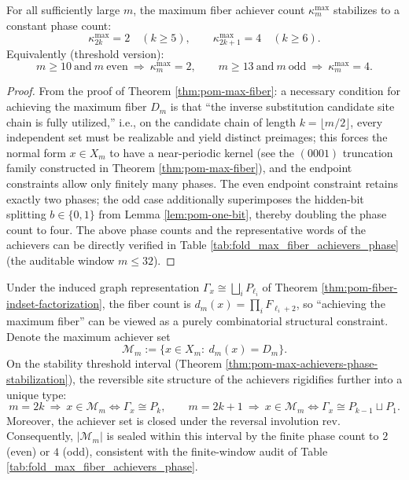 \begin{theorem}\label{thm:pom-max-achievers-phase-stabilization}
For all sufficiently large \(m\), the maximum fiber achiever count \(\kappa_m^{\mathrm{max}}\) stabilizes to a constant phase count:
\[
\kappa_{2k}^{\mathrm{max}}=2\quad(k\ge 5),
\qquad
\kappa_{2k+1}^{\mathrm{max}}=4\quad(k\ge 6).
\]
Equivalently (threshold version):
\[
m\ge 10\ \text{and}\ m\ \text{even}\ \Rightarrow\ \kappa_m^{\mathrm{max}}=2,
\qquad
m\ge 13\ \text{and}\ m\ \text{odd}\ \Rightarrow\ \kappa_m^{\mathrm{max}}=4.
\]
\end{theorem}
\begin{proof}
From the proof of Theorem \ref{thm:pom-max-fiber}: a necessary condition for achieving the maximum fiber \(D_m\) is that ``the inverse substitution candidate site chain is fully utilized,'' i.e., on the candidate chain of length \(k=\lfloor m/2\rfloor\), every independent set must be realizable and yield distinct preimages; this forces the normal form \(x\in X_m\) to have a near-periodic kernel (see the \((0001)\) truncation family constructed in Theorem \ref{thm:pom-max-fiber}), and the endpoint constraints allow only finitely many phases.
The even endpoint constraint retains exactly two phases; the odd case additionally superimposes the hidden-bit splitting \(b\in\{0,1\}\) from Lemma \ref{lem:pom-one-bit}, thereby doubling the phase count to four. The above phase counts and the representative words of the achievers can be directly verified in Table \ref{tab:fold_max_fiber_achievers_phase} (the auditable window \(m\le 32\)).
\end{proof}

\begin{remark}\label{rem:pom-max-achievers-graph-structure}
Under the induced graph representation \(\Gamma_x\cong\bigsqcup_i P_{\ell_i}\) of Theorem \ref{thm:pom-fiber-indset-factorization}, the fiber count is \(d_m(x)=\prod_i F_{\ell_i+2}\), so ``achieving the maximum fiber'' can be viewed as a purely combinatorial structural constraint.
Denote the maximum achiever set
\[
\mathcal{M}_m:=\{x\in X_m:\ d_m(x)=D_m\}.
\]
On the stability threshold interval (Theorem \ref{thm:pom-max-achievers-phase-stabilization}), the reversible site structure of the achievers rigidifies further into a unique type:
\[
m=2k\ \Rightarrow\ x\in\mathcal{M}_m\iff \Gamma_x\cong P_k,
\qquad
m=2k+1\ \Rightarrow\ x\in\mathcal{M}_m\iff \Gamma_x\cong P_{k-1}\sqcup P_1.
\]
Moreover, the achiever set is closed under the reversal involution \(\mathrm{rev}\).
Consequently, \(|\mathcal{M}_m|\) is sealed within this interval by the finite phase count to \(2\) (even) or \(4\) (odd), consistent with the finite-window audit of Table \ref{tab:fold_max_fiber_achievers_phase}.
\end{remark}

